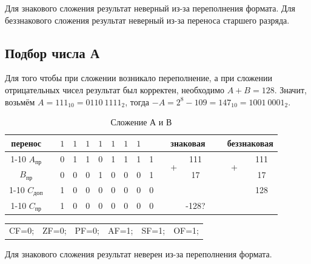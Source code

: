 Для знакового сложения результат неверный из-за переполнения формата.
Для беззнакового сложения результат неверный из-за переноса старшего разряда. 

\subsection{Подбор числа А}
Для того чтобы при сложении возникало переполнение, а при сложении отрицательных
чисел результат был корректен, необходимо $A+B=128$. Значит, возьмём
$A=111_{10}=0110\ 1111_{2}$, тогда $-A=2^8-109=147_{10}=1001\ 0001_{2}$.



\begin{table}[H]
    \centering
    \caption{Сложение А и В}
    \begin{tabular}{c|cc|cccccccp{1cm}ccp{0.5cm}cc}
		\small перенос & & $1$ & $1$ & $1$ & $1$ & $1$ & $1$ & $1$ & & & \multicolumn{2}{c}{знаковая} & \  & \multicolumn{2}{c}{беззнаковая}  \\
		\cline{1-10} \cline{12-13} \cline{15-16}
		$A_{\text{пр}}$ & & 0 & 1 & 1 & 0 & 1 & 1 & 1 & 1 & & \multirow{2}{*}{+} & 111 & \  & \multirow{2}{*}{+} & 111   \\
		$B_{\text{пр}}$ & & 0 & 0 & 0 & 1 & 0 & 0 & 0 & 1 & & & 17 & \  &  & 17 \\
		\cline{1-10} \cline{12-13} \cline{15-16}
		$C_{\text{доп}}$ & & 1 & 0 & 0 & 0 & 0 & 0 & 0 & 0 & & & & \  &  & 128 \\
		\cline{1-10} \cline{12-13} \cline{15-16}
		$C_{\text{пр}}$ & & 1 & 0 & 0 & 0 & 0 & 0 & 0 & 0 & & & -128? & \  &  & \\
    \end{tabular}
\end{table}

\begin{table}[H]
    \centering
    \begin{tabular}{cccccc}
        CF=0; & ZF=0; & PF=0; & AF=1; & SF=1; & OF=1;
    \end{tabular}
\end{table}

Для знакового сложения результат неверен из-за переполнения формата.

